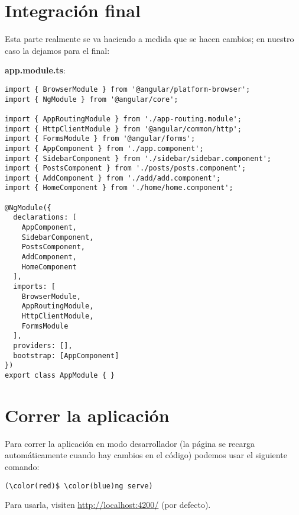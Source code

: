 \documentclass{article}
\begin{document}
\section{Integraci\'on final}
Esta parte realmente se va haciendo a medida que se hacen cambios; en nuestro caso la dejamos para el final:

\vspace{0.5cm}
\textbf{app.module.ts}:
\begin{verbatim}
import { BrowserModule } from '@angular/platform-browser';
import { NgModule } from '@angular/core';

import { AppRoutingModule } from './app-routing.module';
import { HttpClientModule } from '@angular/common/http';
import { FormsModule } from '@angular/forms';
import { AppComponent } from './app.component';
import { SidebarComponent } from './sidebar/sidebar.component';
import { PostsComponent } from './posts/posts.component';
import { AddComponent } from './add/add.component';
import { HomeComponent } from './home/home.component';

@NgModule({
  declarations: [
    AppComponent,
    SidebarComponent,
    PostsComponent,
    AddComponent,
    HomeComponent
  ],
  imports: [
    BrowserModule,
    AppRoutingModule,
    HttpClientModule,
    FormsModule
  ],
  providers: [],
  bootstrap: [AppComponent]
})
export class AppModule { }
\end{verbatim}

\section{Correr la aplicaci\'on}
Para correr la aplicaci\'on en modo desarrollador (la p\'agina se recarga autom\'aticamente cuando hay cambios en el c\'odigo) podemos usar el siguiente comando:

\begin{Verbatim}[fontsize=\small,commandchars=\\\(\)]
    (\color(red)$ \color(blue)ng serve)
\end{Verbatim}

Para usarla, visiten \url{http://localhost:4200/} (por defecto).
\end{document}
